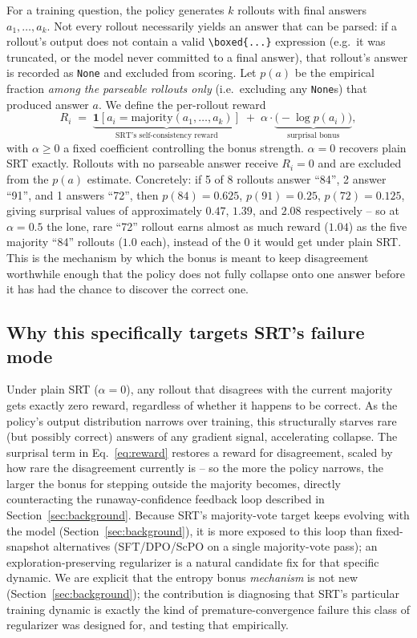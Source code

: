 \documentclass{article}
\begin{document}
For a training question, the policy generates $k$ rollouts with final
answers $a_1,\dots,a_k$. Not every rollout necessarily yields an answer that
can be parsed: if a rollout's output does not contain a valid
\verb|\boxed{...}| expression (e.g.\ it was truncated, or the model never
committed to a final answer), that rollout's answer is recorded as
\texttt{None} and excluded from scoring. Let $p(a)$ be the empirical
fraction \emph{among the parseable rollouts only} (i.e.\ excluding any
\texttt{None}s) that produced answer $a$. We define the per-rollout reward
\begin{equation}
  R_i \;=\; \underbrace{\mathbf{1}[a_i = \text{majority}(a_1,\dots,a_k)]}_{\text{SRT's self-consistency reward}}
  \;+\; \alpha \cdot \underbrace{\big(-\log p(a_i)\big)}_{\text{surprisal bonus}},
  \label{eq:reward}
\end{equation}
with $\alpha \geq 0$ a fixed coefficient controlling the bonus strength.
$\alpha = 0$ recovers plain SRT exactly. Rollouts with no parseable answer
receive $R_i = 0$ and are excluded from the $p(a)$ estimate. Concretely: if 5
of 8 rollouts answer ``84'', 2 answer ``91'', and 1 answers ``72'', then
$p(84){=}0.625$, $p(91){=}0.25$, $p(72){=}0.125$, giving surprisal values of
approximately $0.47$, $1.39$, and $2.08$ respectively -- so at $\alpha{=}0.5$
the lone, rare ``72'' rollout earns almost as much reward ($1.04$) as the
five majority ``84'' rollouts ($1.0$ each), instead of the $0$ it would get
under plain SRT. This is the mechanism by which the bonus is meant to keep
disagreement worthwhile enough that the policy does not fully collapse onto
one answer before it has had the chance to discover the correct one.

\subsection{Why this specifically targets SRT's failure mode}

Under plain SRT ($\alpha{=}0$), any rollout that disagrees with the current
majority gets exactly zero reward, regardless of whether it happens to be
correct. As the policy's output distribution narrows over training, this
structurally starves rare (but possibly correct) answers of any gradient
signal, accelerating collapse. The surprisal term in
Eq.~\ref{eq:reward} restores a reward for disagreement, scaled by how rare
the disagreement currently is -- so the more the policy narrows, the larger
the bonus for stepping outside the majority becomes, directly counteracting
the runaway-confidence feedback loop described in
Section~\ref{sec:background}. Because SRT's majority-vote target keeps
evolving with the model (Section~\ref{sec:background}), it is more exposed to
this loop than fixed-snapshot alternatives (SFT/DPO/ScPO on a single
majority-vote pass); an exploration-preserving regularizer is a natural
candidate fix for that specific dynamic. We are explicit that the entropy
bonus \emph{mechanism} is not new (Section~\ref{sec:background}); the
contribution is diagnosing that SRT's particular training dynamic is exactly
the kind of premature-convergence failure this class of regularizer was
designed for, and testing that empirically.
\end{document}
